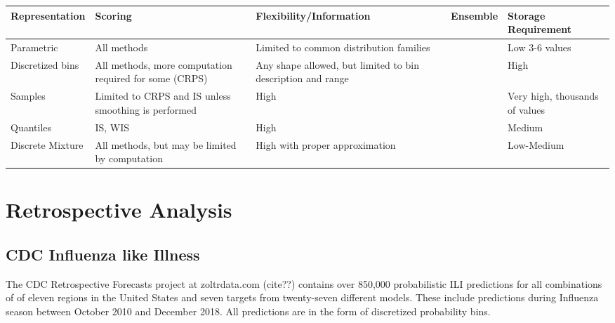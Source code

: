 \documentclass{article}\usepackage[]{graphicx}\usepackage[]{color}
\begin{document}
\begin{flushleft}
    \begin{adjustwidth}{-3cm}{-1cm}
    \begin{tabular}{ | p{2.4cm} | p{2cm} | p{4cm} | p{3cm} | l |}
    \hline
    Representation & Scoring & Flexibility/Information & Ensemble &
    Storage Requirement
    \\ \hline

    Parametric & All methods & Limited to common distribution families 
    &  & Low 3-6 values \\ \hline
    
    Discretized bins & All methods, more computation required for some (CRPS) &
    Any shape allowed, but limited to bin description and range & &
    High
    \\ \hline

    Samples & Limited to CRPS and IS unless smoothing is performed & High & & 
    Very high, thousands of values
    \\ \hline

    
    Quantiles & IS, WIS & High & & Medium 
    \\ \hline
    
    Discrete Mixture & All methods, but may be limited by computation & 
    High with proper approximation &
    & Low-Medium
    \\ \hline

	 \end{tabular}
	 \end{adjustwidth}
\end{flushleft}


\newpage


\section{Retrospective Analysis}

\subsection{CDC Influenza like Illness}
The CDC Retrospective Forecasts project at zoltrdata.com (cite??) contains over
850,000 probabilistic ILI predictions for all combinations of of eleven regions 
in the United States and seven targets from twenty-seven different models. These
include predictions during Influenza season between October 2010 and December
2018. All predictions are in the form of discretized probability bins. 
\end{document}
